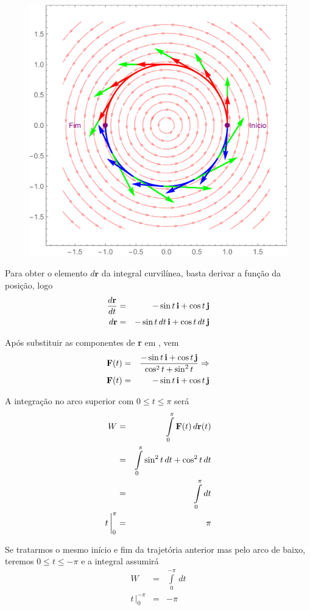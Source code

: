 \documentclass[a4paper, 12pt, brazilian]{article}
\begin{document}
	\begin{figure}[H]
		\centering
		\includegraphics[width=0.7\linewidth]{images/g26}
		\label{fig:g26}
	\end{figure}

	Para obter o elemento $d\textbf{r}$ da integral curvilínea, basta derivar a função da posição, logo
	\begin{eqnarray}
		\dfrac{d\textbf{r}}{dt}&=&-\sin t\,\textbf{i}+\cos t\,\textbf{j}\\
		d\textbf{r}&=&-\sin t\,dt\,\textbf{i}+\cos t\,dt\,\textbf{j}
	\end{eqnarray}
	
	Após substituir as componentes de \textbf{r} em \force, vem
	\begin{eqnarray}
		\textbf{F}(t)&=&\dfrac{-\sin t\,\textbf{i}+\cos t\,\textbf{j}}{\cos^{2}t+\sin^{2}t}\Rightarrow\\
		\textbf{F}(t)&=&-\sin t\,\textbf{i}+\cos t\,\textbf{j}
	\end{eqnarray}
	
	A integração no arco superior com $0\leq t\leq\pi$ será
	\begin{eqnarray}
		W&=&\int\limits_{0}^{\pi}\textbf{F}(t)\,d\textbf{r}(t)\\
		&=&\int\limits_{0}^{\pi}\sin^{2}t\,dt+\cos^{2}t\,dt\\
		&=&\int\limits_{0}^{\pi}dt\\
		t\,\bigg|_{0}^{\pi}&=&\pi
	\end{eqnarray}
	
	Se tratarmos o mesmo início e fim da trajetória anterior mas pelo arco de baixo, teremos $0\leq t\leq -\pi$ e a integral assumirá	
	\begin{eqnarray}
		W&=&\int\limits_{0}^{-\pi}\,dt\\
		t\,\bigg|_{0}^{-\pi}&=&-\pi\\
	\end{eqnarray}
	
\end{document}

